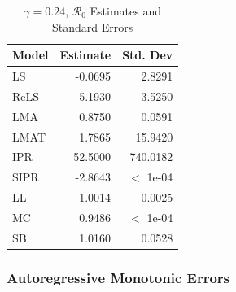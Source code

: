 \documentclass[12pt]{article}
\newcommand{\rr}{\ensuremath{\mathcal{R}_0}}
\begin{document}
\begin{table}[H]
	
	\centering
	\begin{tabular}[t]{l|r|r}
		\hline
		Model & Estimate & Std. Dev\\
		\hline
		LS & -0.0695 & 2.8291\\
		\hline
		ReLS & 5.1930 & 3.5250\\
		\hline
		LMA & 0.8750 & 0.0591\\
		\hline
		LMAT & 1.7865 & 15.9420\\
		\hline
		IPR & 52.5000 & 740.0182\\
		\hline
		SIPR & -2.8643 & $<$ 1e-04\\
		\hline
		LL & 1.0014 & 0.0025\\
		\hline
		MC & 0.9486 & $<$ 1e-04\\
		\hline
		SB & 1.0160 & 0.0528\\
		\hline
	\end{tabular}
	\caption{$\gamma = 0.24$, $\rr$ Estimates and Standard Errors}
\end{table}

\subsubsection{Autoregressive Monotonic Errors}
\end{document}
